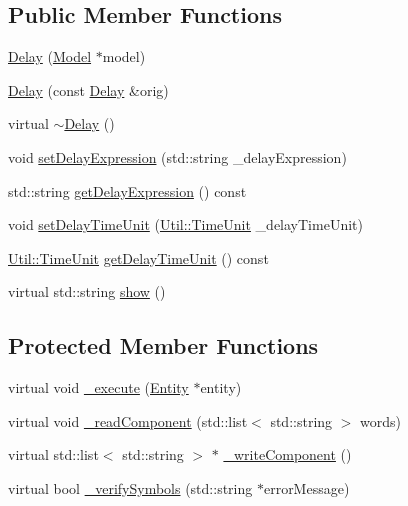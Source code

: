\subsection*{Public Member Functions}
\begin{DoxyCompactItemize}
\item 
\hyperlink{class_delay_a155ad32911b3289d968cca746f940520}{Delay} (\hyperlink{class_model}{Model} $\ast$model)
\item 
\hyperlink{class_delay_a5892fd8feb283f11980c0a9adb9befa7}{Delay} (const \hyperlink{class_delay}{Delay} \&orig)
\item 
virtual \hyperlink{class_delay_afee934130955d45563a6c5baaaf052d2}{$\sim$\-Delay} ()
\item 
void \hyperlink{class_delay_a683b53af607a424477acb946eb3afdfc}{set\-Delay\-Expression} (std\-::string \-\_\-delay\-Expression)
\item 
std\-::string \hyperlink{class_delay_a58559eda9ed25330d29b967c1bb0add5}{get\-Delay\-Expression} () const 
\item 
void \hyperlink{class_delay_abe7e89dba0974a81d00e6d2c0548fc1e}{set\-Delay\-Time\-Unit} (\hyperlink{class_util_aadbd82055afeaa7d4fb4da513de628ff}{Util\-::\-Time\-Unit} \-\_\-delay\-Time\-Unit)
\item 
\hyperlink{class_util_aadbd82055afeaa7d4fb4da513de628ff}{Util\-::\-Time\-Unit} \hyperlink{class_delay_a0561a6fdb4dd317952b5bb8d87b0c15f}{get\-Delay\-Time\-Unit} () const 
\item 
virtual std\-::string \hyperlink{class_delay_af8187e4515417b547dc22b5ee0a1f95d}{show} ()
\end{DoxyCompactItemize}
\subsection*{Protected Member Functions}
\begin{DoxyCompactItemize}
\item 
virtual void \hyperlink{class_delay_a029d91a2cd736ff9c361c69336e6ab41}{\-\_\-execute} (\hyperlink{class_entity}{Entity} $\ast$entity)
\item 
virtual void \hyperlink{class_delay_a9d199bd226f9e504b6f6b6619d8f14dc}{\-\_\-read\-Component} (std\-::list$<$ std\-::string $>$ words)
\item 
virtual std\-::list$<$ std\-::string $>$ $\ast$ \hyperlink{class_delay_aeb8506fddf709ad5e55fc67170e875b0}{\-\_\-write\-Component} ()
\item 
virtual bool \hyperlink{class_delay_af1690df9ba58e9972f5721f5bdc2b520}{\-\_\-verify\-Symbols} (std\-::string $\ast$error\-Message)
\end{DoxyCompactItemize}
